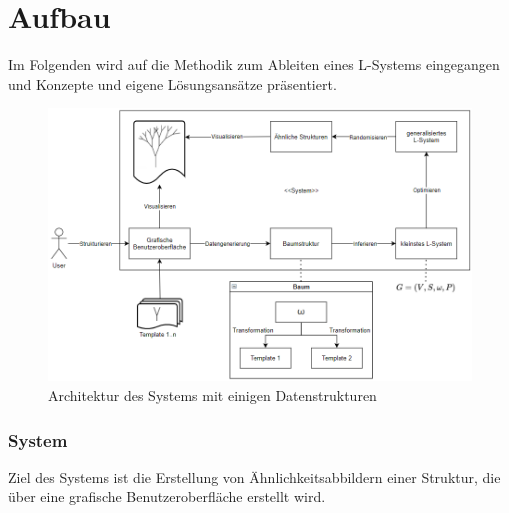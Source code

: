 \section{Aufbau}

Im Folgenden wird auf die Methodik zum Ableiten eines L-Systems eingegangen und Konzepte und eigene Lösungsansätze
präsentiert.

\begin{figure}[H]
    \centering
    \includegraphics[width=14cm]{../images/System.PNG}
    \caption[Systemarchitektur]{Architektur des Systems mit einigen Datenstrukturen}
\end{figure}

\subsubsection{System}
Ziel des Systems ist die Erstellung von Ähnlichkeitsabbildern einer Struktur, die über eine grafische
Benutzeroberfläche erstellt wird.